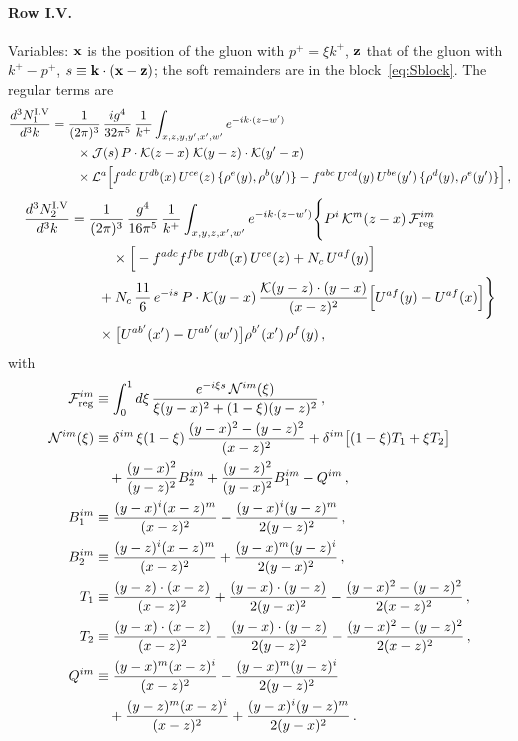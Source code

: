 \paragraph{Row I.V.} Variables: $\mathbf{x}$ is the position of the gluon with $p^+=\xi k^+$, $\mathbf{z}$ that of the gluon with $k^+-p^+$, $s\equiv\mathbf{k}\cdot(\mathbf{x}-\mathbf{z})$; the soft remainders are in the block~\eqref{eq:Sblock}. The regular terms are
\begin{align}\label{eq:app_V1}
\frac{d^3N^{\rm I.V}_1}{d^3k}&=\frac{1}{(2\pi)^3}\,\frac{ig^4}{32\pi^5}\,\frac{1}{k^+}\int_{x,z,y,y',x',w'}e^{-ik\cdot(z-w')}\notag\\&\qquad\times\mathcal J(s)\,P\cdot\mathcal{K}(z-x)\;\mathcal{K}(y-z)\cdot\mathcal{K}(y'-x)\notag\\
&\qquad\times\mathcal L^a\Big[f^{adc}\,U^{db}(x)\,U^{ce}(z)\,\{\rho^e(y),\rho^b(y')\}-f^{abc}\,U^{cd}(y)\,U^{be}(y')\,\{\rho^d(y),\rho^e(y')\}\Big]\,,
\end{align}
\begin{align}\label{eq:app_V2}
\frac{d^3N^{\rm I.V}_2}{d^3k}&=\frac{1}{(2\pi)^3}\,\frac{g^4}{16\pi^5}\,\frac{1}{k^+}\int_{x,y,z,x',w'}e^{-ik\cdot(z-w')}\Bigg\{P^i\,\mathcal{K}^m(z-x)\,\mathcal F^{im}_{\rm reg}\notag\\&\qquad\quad\times\Big[-f^{adc}f^{fbe}\,U^{db}(x)\,U^{ce}(z)+N_c\,U^{af}(y)\Big]\notag\\
&\qquad+N_c\,\frac{11}{6}\,e^{-is}\,P\cdot\mathcal{K}(y-x)\,\frac{\mathcal{K}(y-z)\cdot(y-x)}{(x-z)^2}\Big[U^{af}(y)-U^{af}(x)\Big]\Bigg\}\notag\\&\qquad\times\big[U^{ab'}(x')-U^{ab'}(w')\big]\rho^{b'}(x')\,\rho^f(y)\,,
\end{align}
with
\begin{align}\label{eq:app_Freg}
\mathcal F^{im}_{\rm reg}&\equiv\int_0^1d\xi\,\frac{e^{-i\xi s}\,\mathcal N^{im}(\xi)}{\xi(y-x)^2+(1-\xi)(y-z)^2}\,,\notag\\
\mathcal N^{im}(\xi)&\equiv\delta^{im}\,\xi(1-\xi)\,\frac{(y-x)^2-(y-z)^2}{(x-z)^2}+\delta^{im}\big[(1-\xi)T_1+\xi T_2\big]\notag\\&\quad+\frac{(y-x)^2}{(y-z)^2}B_2^{im}+\frac{(y-z)^2}{(y-x)^2}B_1^{im}-Q^{im}\,,\notag\\
B_1^{im}&\equiv\frac{(y-x)^i(x-z)^m}{(x-z)^2}-\frac{(y-x)^i(y-z)^m}{2(y-z)^2}\,,\notag\\
B_2^{im}&\equiv\frac{(y-z)^i(x-z)^m}{(x-z)^2}+\frac{(y-x)^m(y-z)^i}{2(y-x)^2}\,,\notag\\
T_1&\equiv\frac{(y-z)\cdot(x-z)}{(x-z)^2}+\frac{(y-x)\cdot(y-z)}{2(y-x)^2}-\frac{(y-x)^2-(y-z)^2}{2(x-z)^2}\,,\notag\\
T_2&\equiv\frac{(y-x)\cdot(x-z)}{(x-z)^2}-\frac{(y-x)\cdot(y-z)}{2(y-z)^2}-\frac{(y-x)^2-(y-z)^2}{2(x-z)^2}\,,\notag\\
Q^{im}&\equiv\frac{(y-x)^m(x-z)^i}{(x-z)^2}-\frac{(y-x)^m(y-z)^i}{2(y-z)^2}\notag\\&\quad+\frac{(y-z)^m(x-z)^i}{(x-z)^2}+\frac{(y-x)^i(y-z)^m}{2(y-x)^2}\,.
\end{align}
